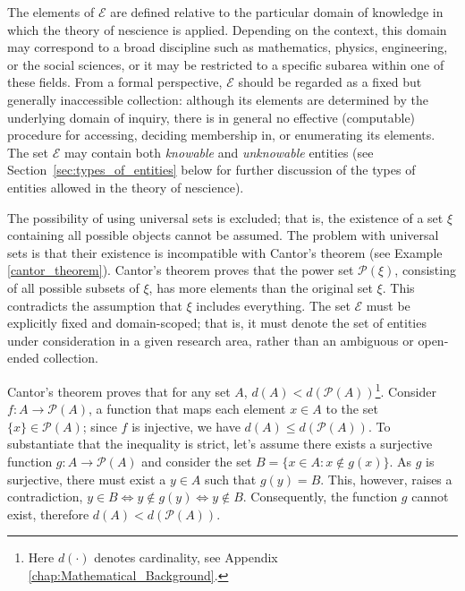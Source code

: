 The elements of $\mathcal{E}$ are defined relative to the particular domain of knowledge in which the theory of nescience is applied. Depending on the context, this domain may correspond to a broad discipline such as mathematics, physics, engineering, or the social sciences, or it may be restricted to a specific subarea within one of these fields. From a formal perspective, $\mathcal{E}$ should be regarded as a fixed but generally inaccessible collection: although its elements are determined by the underlying domain of inquiry, there is in general no effective (computable) procedure for accessing, deciding membership in, or enumerating its elements.  The set $\mathcal{E}$ may contain both \emph{knowable} and \emph{unknowable} entities (see Section~\ref{sec:types_of_entities} below for further discussion of the types of entities allowed in the theory of nescience). 

The possibility of using universal sets is excluded; that is, the existence of a set $\xi$ containing all possible objects cannot be assumed. The problem with universal sets is that their existence is incompatible with Cantor's theorem (see Example \ref{cantor_theorem}). Cantor's theorem proves that the power set $\mathcal{P}(\xi)$, consisting of all possible subsets of $\xi$, has more elements than the original set $\xi$. This contradicts the assumption that $\xi$ includes everything. The set $\mathcal{E}$ must be explicitly fixed and domain-scoped; that is, it must denote the set of entities under consideration in a given research area, rather than an ambiguous or open-ended collection.

\begin{example}
\label{cantor_theorem}
Cantor's theorem proves that for any set $A$, $d(A) < d\left(\mathcal{P}(A)\right)$\footnote{Here $d(\cdot)$ denotes cardinality, see Appendix \ref{chap:Mathematical_Background}.}. Consider $f: A \rightarrow \mathcal{P}(A)$, a function that maps each element $x \in A$ to the set $\{x\} \in \mathcal{P}(A)$; since $f$ is injective, we have $d(A) \leq d\left(\mathcal{P}(A)\right)$. To substantiate that the inequality is strict, let's assume there exists a surjective function $g: A \rightarrow \mathcal{P}(A)$ and consider the set $B = \{ x \in A : x \notin g(x) \}$. As $g$ is surjective, there must exist a $y \in A$ such that $g(y) = B$. This, however, raises a contradiction, $y\in B\iff y\notin g(y)\iff y\notin B$. Consequently, the function $g$ cannot exist, therefore $d(A) < d\left(\mathcal{P}(A)\right)$.
\end{example}

